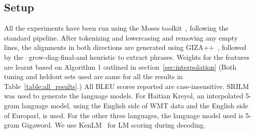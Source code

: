 \documentclass[11pt]{article}
\begin{document}
\begin{comment}
\subsection{Pre-processing}

	The English and French side of Mawukakan and Maninkakan parallel data sometimes have forward slashes separating equivalent English and French translations. For both, the feminine form was chosen. For instance, a sentence 
	\begin{verbatim}
		he/she/it goes to school
	\end{verbatim} 
		was replaced by the english sentence \\
	\begin{verbatim}
		she goes to school
	\end{verbatim}

	Text between square brackets was removed. As development, heldout and test sets are not separately released, the last 2000 sentences was used for development, heldout and test together, for both Mawukakan and Maninkakan. The top 1000 was kept aside for development, while 500 each was kept aside for heldout and test. The last 2000 sentences make up 40\% of the total data for Mawukakan and 33\% of the total data for Maninkakan. We kept aside a large percentage for development and testing to get a better idea about the difference between the various models. 

	Both Haitian Kreyol and Malagasy are tokenized using the French tokenizer that is part of the Moses toolkit while Mawukakan and Maninkakan are tokenized using the English tokenizer. 
\end{comment}

\subsection{Setup}
	All the experiments have been run using the Moses toolkit~\cite{Koehn:07}, following the standard pipeline. After tokenizing and lowercasing and removing any empty lines, the alignments in both directions are generated using GIZA++~\cite{OchNey:03}, followed by the --grow-diag-final-and heuristic to extract phrases. Weights for the features are learnt based on Algorithm 1 outlined in section~\ref{sec:interpolation} (Both tuning and heldout sets used are same for all the results in Table~\ref{table:all_results}.) All BLEU scores reported are case-insensitive. SRILM~\cite{Stolcke:02} was used to generate the language models. For Haitian Kreyol, an interpolated 5-gram language model, using the English side of WMT data and the English side of Europarl, is used. For the other three languages, the language model used is 5-gram Gigaword. We use KenLM~\cite{Ken:11} for LM scoring during decoding. 
\end{document}
